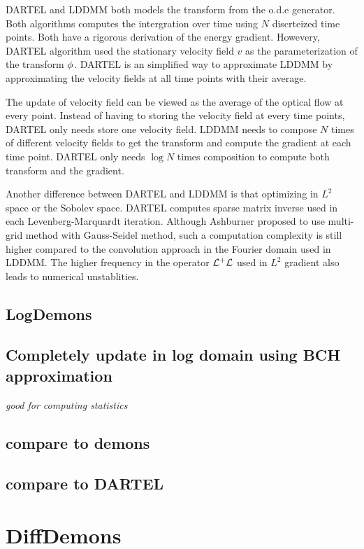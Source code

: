 \documentclass[letterpaper,12pt]{article}
\begin{document}
DARTEL and LDDMM both models the transform from the o.d.e generator. Both algorithms computes the intergration over time using $N$ discrteized time points. Both have a rigorous derivation of the energy gradient. 
Howevery, DARTEL algorithm used the stationary velocity field $v$ as the parameterization of the transform $\phi$. DARTEL is an simplified way to approximate LDDMM by approximating the velocity fields at all time points with their average.

The update of velocity field can be viewed as the average of the optical flow at every point. Instead of having to storing the velocity field at every time points, DARTEL only needs store one velocity field. LDDMM needs to compose $N$ times of different velocity fields to get the transform and compute the gradient at each time point. DARTEL only needs $\log N$ times composition to compute both transform and the gradient. 

Another difference between DARTEL and LDDMM is that optimizing in $L^2$ space or the Sobolev space. DARTEL computes sparse matrix inverse used in each Levenberg-Marquardt iteration. Although Ashburner proposed to use multi-grid method with Gauss-Seidel method, such a computation complexity is still higher compared to the convolution approach in the Fourier domain used in LDDMM. The higher frequency in the operator $\mathcal{L}^+\mathcal{L}$ used in $L^2$ gradient also leads to numerical unstablities.


\subsection{LogDemons}



\subsection{Completely update in log domain using BCH approximation}
\textit{good for computing statistics}
\subsection{compare to demons}
\subsection{compare to DARTEL}


\section{DiffDemons}
\end{document}
